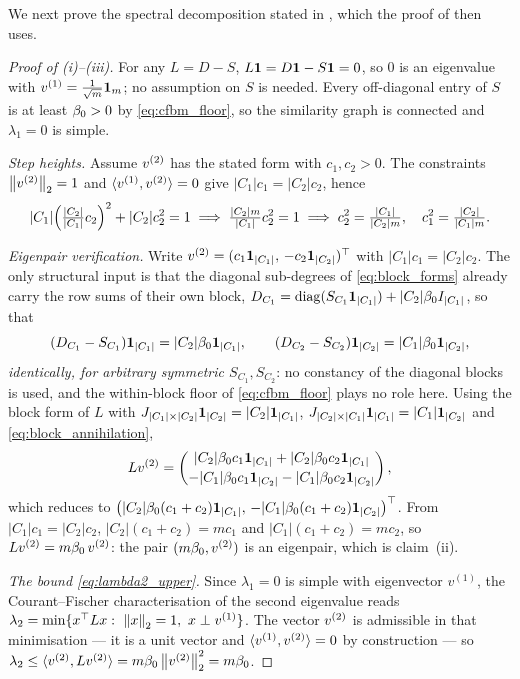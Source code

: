 \noindent We next prove the spectral decomposition stated in ,
which the proof of  then uses.

\begin{proof}[Proof of (i)--(iii)]
For any $L=D-S$, $L\mathbf{1}=D\mathbf{1}-S\mathbf{1}=0$, so $0$ is an eigenvalue with
$v^{(1)}=\tfrac1{\sqrt m}\mathbf{1}_m$; no assumption on $S$ is needed. Every off-diagonal
entry of $S$ is at least $\beta_0>0$ by \eqref{eq:cfbm_floor}, so the similarity graph is
connected and $\lambda_1=0$ is simple.

\emph{Step heights.} Assume $v^{(2)}$ has the stated form with $c_1,c_2>0$. The
constraints $\left\lVert v^{(2)} \right\rVert_2=1$ and $\langle v^{(1)},v^{(2)}\rangle=0$ give $|C_1|c_1=|C_2|c_2$,
hence
\[
   |C_1|\Bigl(\tfrac{|C_2|}{|C_1|}c_2\Bigr)^2+|C_2|c_2^2=1
   \;\Longrightarrow\;\tfrac{|C_2|m}{|C_1|}c_2^2=1
   \;\Longrightarrow\; c_2^2=\tfrac{|C_1|}{|C_2|m},\quad c_1^2=\tfrac{|C_2|}{|C_1|m}.
\]

\emph{Eigenpair verification.} Write $v^{(2)}=(c_1\mathbf{1}_{|C_1|},\,-c_2\mathbf{1}_{|C_2|})^\top$ with
$|C_1|c_1=|C_2|c_2$. The only structural input is that the diagonal sub-degrees of
\eqref{eq:block_forms} already carry the row sums of their own block,
$D_{C_1}=\operatorname{diag}(S_{C_1}\mathbf{1}_{|C_1|})+|C_2|\beta_0 I_{|C_1|}$, so that
\begin{equation}\label{eq:block_annihilation}
   (D_{C_1}-S_{C_1})\mathbf{1}_{|C_1|}=|C_2|\beta_0\mathbf{1}_{|C_1|},\qquad(D_{C_2}-S_{C_2})\mathbf{1}_{|C_2|}=|C_1|\beta_0\mathbf{1}_{|C_2|},
\end{equation}
\emph{identically, for arbitrary symmetric $S_{C_1},S_{C_2}$}: no constancy of the diagonal
blocks is used, and the within-block floor of \eqref{eq:cfbm_floor} plays no role here.
Using the block form of $L$ with $J_{|C_1|\times|C_2|}\mathbf{1}_{|C_2|}=|C_2|\mathbf{1}_{|C_1|}$,
$J_{|C_2|\times|C_1|}\mathbf{1}_{|C_1|}=|C_1|\mathbf{1}_{|C_2|}$ and \eqref{eq:block_annihilation},
\[
   Lv^{(2)}=
   \begin{pmatrix}
     |C_2|\beta_0 c_1\mathbf{1}_{|C_1|}+|C_2|\beta_0 c_2\mathbf{1}_{|C_1|}\\[2pt]
     -|C_1|\beta_0 c_1\mathbf{1}_{|C_2|}-|C_1|\beta_0 c_2\mathbf{1}_{|C_2|}
   \end{pmatrix},
\]
which reduces to
$\bigl(|C_2|\beta_0(c_1+c_2)\mathbf{1}_{|C_1|},\,-|C_1|\beta_0(c_1+c_2)\mathbf{1}_{|C_2|}\bigr)^\top$. From
$|C_1|c_1=|C_2|c_2$, $|C_2|(c_1+c_2)=mc_1$ and $|C_1|(c_1+c_2)=mc_2$, so $Lv^{(2)}=m\beta_0\,v^{(2)}$: the pair
$(m\beta_0,v^{(2)})$ is an eigenpair, which is claim~(ii).

\emph{The bound \eqref{eq:lambda2_upper}.} Since $\lambda_1=0$ is simple with
eigenvector $v^{(1)}$, the Courant--Fischer characterisation of the second
eigenvalue reads $\lambda_2=\min\{x^\top Lx:\ \norm{x}_2=1,\ x\perp v^{(1)}\}$. The
vector $v^{(2)}$ is admissible in that minimisation --- it is a unit vector and
$\langle v^{(1)},v^{(2)}\rangle=0$ by construction --- so
$\lambda_2\le\langle v^{(2)},Lv^{(2)}\rangle=m\beta_0\left\lVert v^{(2)} \right\rVert_2^2=m\beta_0$.
\end{proof}

